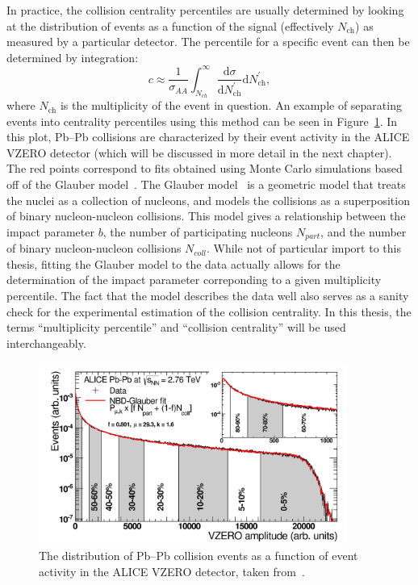 In practice, the collision centrality percentiles are usually determined by looking at the distribution of events as a function of the signal (effectively $N_\text{ch}$) as measured by a particular detector. The percentile for a specific event can then be determined by integration:
%
\begin{equation}
    \label{eq:centrality_distribution}
    c \approx \frac{1}{\sigma_{A A}} \int_{N_{c h}}^{\infty} \frac{\mathrm{d} \sigma}{\mathrm{d} N_{\mathrm{ch}}^{\prime}} \mathrm{d} N_{\mathrm{ch}}^{\prime},
\end{equation}
%
where $N_\text{ch}$ is the multiplicity of the event in question. An example of separating events into centrality percentiles using this method can be seen in Figure~\ref{fig:alice_centrality}. In this plot, Pb--Pb collisions are characterized by their event activity in the ALICE VZERO detector (which will be discussed in more detail in the next chapter). The red points correspond to fits obtained using Monte Carlo simulations based off of the Glauber model~\cite{GlauberModelALICE1, GlauberModelALICE2}. The Glauber model~\cite{GlauberModel} is a geometric model that treats the nuclei as a collection of nucleons, and models the collisions as a superposition of binary nucleon-nucleon collisions. This model gives a relationship between the impact parameter $b$, the number of participating nucleons $N_{part}$, and the number of binary nucleon-nucleon collisions $N_{coll}$. While not of particular import to this thesis, fitting the Glauber model to the data actually allows for the determination of the impact parameter correponding to a given multiplicity percentile. The fact that the model describes the data well also serves as a sanity check for the experimental estimation of the collision centrality. In this thesis, the terms ``multiplicity percentile'' and ``collision centrality'' will be used interchangeably.

\begin{figure}[t!]
    \centering
    \includegraphics[width=0.9\textwidth]{figures/introduction/alice_centrality.png}
    \caption{The distribution of Pb--Pb collision events as a function of event activity in the ALICE VZERO detector, taken from~\cite{GlauberModelALICE2}.}
    \label{fig:alice_centrality}
\end{figure}

